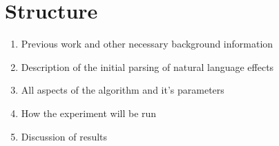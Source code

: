 \section{Structure}
\label{sec:intro:structure}
\begin{enumerate}
	\item Previous work and other necessary background information
	\item Description of the initial parsing of natural language effects 
	\item All aspects of the algorithm and it's parameters
	\item How the experiment will be run
	\item Discussion of results
\end{enumerate}
